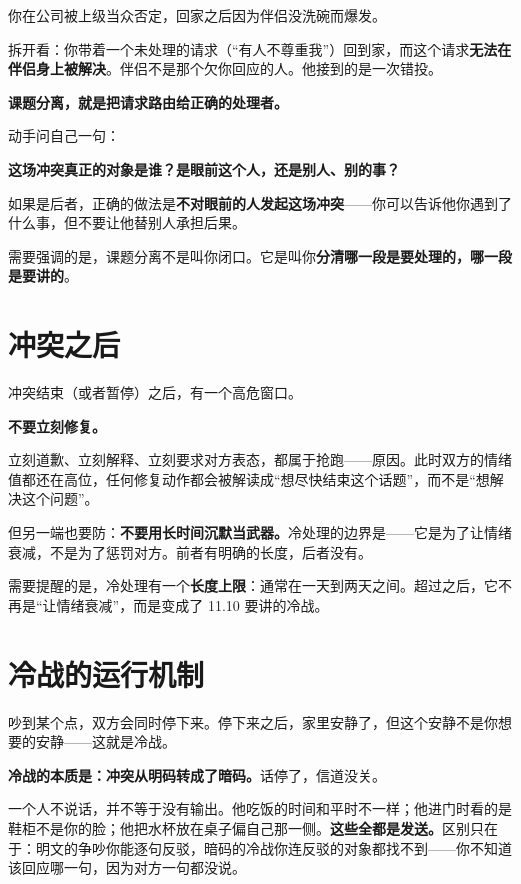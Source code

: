 \begin{mdquote}
你在公司被上级当众否定，回家之后因为伴侣没洗碗而爆发。
\end{mdquote}

拆开看：你带着一个未处理的请求（“有人不尊重我”）回到家，而这个请求\textbf{无法在伴侣身上被解决}。伴侣不是那个欠你回应的人。他接到的是一次错投。

\textbf{课题分离，就是把请求路由给正确的处理者。}

动手问自己一句：

\begin{mdquote}
\textbf{这场冲突真正的对象是谁？是眼前这个人，还是别人、别的事？}
\end{mdquote}

如果是后者，正确的做法是\textbf{不对眼前的人发起这场冲突}——你可以告诉他你遇到了什么事，但不要让他替别人承担后果。

需要强调的是，课题分离不是叫你闭口。它是叫你\textbf{分清哪一段是要处理的，哪一段是要讲的}。

\section{冲突之后}

冲突结束（或者暂停）之后，有一个高危窗口。

\textbf{不要立刻修复。}

立刻道歉、立刻解释、立刻要求对方表态，都属于抢跑——原因。此时双方的情绪值都还在高位，任何修复动作都会被解读成“想尽快结束这个话题”，而不是“想解决这个问题”。

但另一端也要防：\textbf{不要用长时间沉默当武器。}冷处理的边界是——它是为了让情绪衰减，不是为了惩罚对方。前者有明确的长度，后者没有。

需要提醒的是，冷处理有一个\textbf{长度上限}：通常在一天到两天之间。超过之后，它不再是“让情绪衰减”，而是变成了 11.10 要讲的冷战。

\section{冷战的运行机制}

吵到某个点，双方会同时停下来。停下来之后，家里安静了，但这个安静不是你想要的安静——这就是冷战。

\textbf{冷战的本质是：冲突从明码转成了暗码。}话停了，信道没关。

一个人不说话，并不等于没有输出。他吃饭的时间和平时不一样；他进门时看的是鞋柜不是你的脸；他把水杯放在桌子偏自己那一侧。\textbf{这些全都是发送。}区别只在于：明文的争吵你能逐句反驳，暗码的冷战你连反驳的对象都找不到——你不知道该回应哪一句，因为对方一句都没说。

